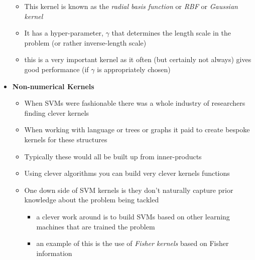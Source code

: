 \documentclass[11pt]{article}
\begin{document}
\begin{itemize}
\begin{itemize}
\item This kernel is known as the \emph{radial basis function} or \emph{RBF} or
\emph{Gaussian kernel}
\item It has a hyper-parameter, \(\gamma\) that determines the length
scale in the problem (or rather inverse-length scale)
\item this is a very important kernel as it often (but certainly not
always) gives good performance (if \(\gamma\) is appropriately chosen)
\end{itemize}
\item \textbf{Non-numerical Kernels}
\begin{itemize}
\item When SVMs were fashionable there was a whole industry of
researchers finding clever kernels
\item When working with language or trees or graphs it paid to create
bespoke kernels for these structures
\item Typically these would all be built up from inner-products
\item Using clever algorithms you can build very clever kernels
functions
\item One down side of SVM kernels is they don't naturally capture
prior knowledge about the problem being tackled
\begin{itemize}
\item a clever work around is to build SVMs based on other learning
machines that are trained the problem
\item an example of this is the use of \emph{Fisher kernels} based on
Fisher information
\end{itemize}
\end{itemize}
\end{itemize}
\end{document}
